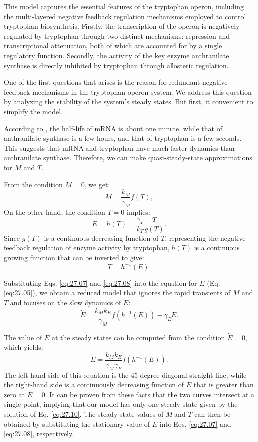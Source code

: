 This model captures the essential features of the tryptophan operon, including the multi-layered negative feedback regulation mechanisms employed to control tryptophan biosynthesis. Firstly, the transcription of the operon is negatively regulated by tryptophan through two distinct mechanisms: repression and transcriptional attenuation, both of which are accounted for by a single regulatory function. Secondly, the activity of the key enzyme anthranilate synthase is directly inhibited by tryptophan through allosteric regulation. 

One of the first questions that arises is the reason for redundant negative feedback mechanisms in the tryptophan operon system. We address this question by analyzing the stability of the system's steady states. But first, it convenient to simplify the model.

According to \cite{Santillan2004}, the half-life of mRNA is about one minute, while that of anthranilate synthase is a few hours, and that of tryptophan is a few seconds. This suggests that mRNA and tryptophan have much faster dynamics than anthranilate synthase. Therefore, we can make quasi-steady-state approximations for $M$ and $T$.

From the condition $\dot{M}=0$, we get:
\begin{equation}
M = \frac{k_M}{\gamma_M} f(T), \label{eq:27.07}
\end{equation}
On the other hand, the condition $\dot{T}=0$ implies:
\begin{equation*}
E = h(T)=\frac{\gamma_T}{k_T} \frac{T}{g(T)}.
\end{equation*}
Since $g(T)$ is a continuous decreasing function of $T$, representing the negative feedback regulation of enzyme activity by tryptophan, $h(T)$ is a continuous growing function that can be inverted to give:
\begin{equation}
T= h^{-1}(E). \label{eq:27.08}
\end{equation}

Substituting Eqs. \eqref{eq:27.07} and \eqref{eq:27.08} into the equation for $\dot{E}$ (Eq. \eqref{eq:27.05}), we obtain a reduced model that ignores the rapid transients of $M$ and $T$ and focuses on the slow dynamics of $E$:
\begin{equation}
\dot{E} = \frac{k_M k_E}{\gamma_M} f(h^{-1}(E)) - \gamma_E E. \label{eq:27.09}
\end{equation}

The value of $E$ at the steady states can be computed from the condition $\dot{E}=0$, which yields:
\begin{equation}
E = \frac{k_M k_E}{\gamma_M \gamma_E} f(h^{-1}(E)). \label{eq:27.10}
\end{equation}
The left-hand side of this equation is the 45-degree diagonal straight line, while the right-hand side is a continuously decreasing function of $E$ that is greater than zero at $E=0$. It can be proven from these facts that the two curves intersect at a single point, implying that our model has only one steady state given by the solution of Eq. \eqref{eq:27.10}. The steady-state values of $M$ and $T$ can then be obtained by substituting the stationary value of $E$ into Eqs. \eqref{eq:27.07} and \eqref{eq:27.08}, respectively.

